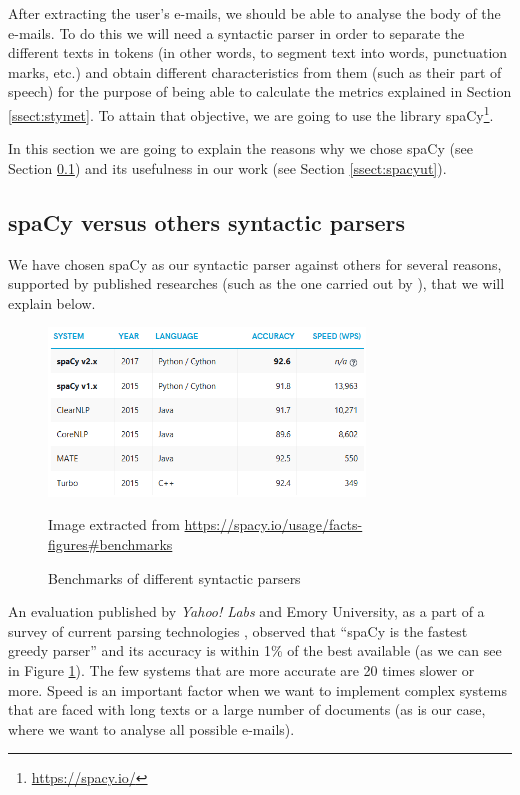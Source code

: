 After extracting the user's e-mails, we should be able to analyse the body of the e-mails. To do this we will need a syntactic parser in order to separate the different texts in tokens (in other words, to segment text into words, punctuation marks, etc.) and obtain different characteristics from them (such as their part of speech) for the purpose of being able to calculate the metrics explained in Section \ref{ssect:stymet}. To attain that objective, we are going to use the library spaCy\footnote{\url{https://spacy.io/}}.

In this section we are going to explain the reasons why we chose spaCy (see Section \ref{ssect:spacywhy}) and its usefulness in our work (see Section \ref{ssect:spacyut}).

\subsection{spaCy versus others syntactic parsers}\label{ssect:spacywhy}

We have chosen spaCy as our syntactic parser against others for several reasons, supported by published researches (such as the one carried out by \cite{choi2015depends}), that we will explain below.

\begin{figure}[h]
	\centering%
	\includegraphics[width = 0.75\textwidth]{Imagenes/Bitmap/Spacy/spacyeval.png}%
	\caption{Benchmarks of different syntactic parsers}%
	Image extracted from \url{https://spacy.io/usage/facts-figures#benchmarks}
	\label{fig:spacyeval}
\end{figure}

An evaluation published by \textit{Yahoo! Labs} and Emory University, as a part of a survey of current parsing technologies \citep{choi2015depends}, observed that ``spaCy is the fastest greedy parser'' and its accuracy is within 1\% of the best available (as we can see in Figure \ref{fig:spacyeval}). The few systems that are more accurate are 20 times slower or more. Speed is an important factor when we want to implement complex systems that are faced with long texts or a large number of documents (as is our case, where we want to analyse all possible e-mails).

